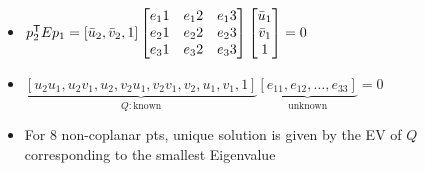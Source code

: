 \begin{itemize}
\begin{itemize}
            \item $p_2^{\mathsf{T}} E p_1 = [\bar u_2, \bar v_2, 1]
                \begin{bmatrix}
                    e_11 & e_12 & e_13\\
                    e_21 & e_22 & e_23\\
                    e_31 & e_32 & e_33
                \end{bmatrix}
                \begin{bmatrix}
                    \bar u_1\\
                    \bar v_1\\
                    1
                \end{bmatrix} = 0$
            \item $\underbrace{[u_2u_1, u_2v_1, u_2, v_2u_1, v_2v_1, v_2, u_1, v_1, 1]}_{Q: \text{known}}\underbrace{[e_{11}, e_{12}, \dots, e_{33}]}_{\text{unknown}} = 0$
            \item For $8$ non-coplanar pts, unique solution is given by the EV of $Q$ corresponding to the smallest Eigenvalue
        \end{itemize}
\end{itemize}

